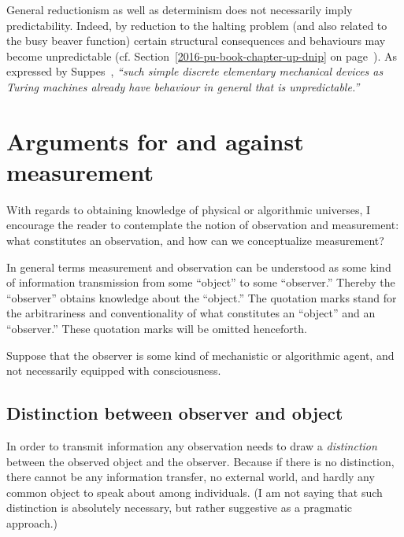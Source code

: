 General reductionism as well as
determinism does not necessarily imply predictability.
Indeed, by reduction to the halting problem
(and also related to the busy beaver function)
certain structural consequences and behaviours
may become unpredictable (cf. Section~\ref{2016-pu-book-chapter-up-dnip} on page~\pageref{2016-pu-book-chapter-up-dnip}).
As expressed by Suppes~\cite[p.~246]{suppes-1993},
{\em ``such simple discrete elementary mechanical devices as Turing machines already have behaviour in general that is unpredictable.''}



\section{Arguments for and against measurement}
\label{2016-pu-book-chapter-eo-measurement}

With regards to obtaining knowledge of physical or algorithmic  universes,
I encourage the reader to contemplate the notion of observation and measurement: what constitutes an observation,
and how can we conceptualize measurement?


In general terms measurement and observation
can be understood as some kind of information transmission from some ``object'' to some ``observer.''
Thereby the ``observer'' obtains knowledge about the ``object.''
The quotation marks stand for the arbitrariness and conventionality of what constitutes an ``object'' and an ``observer.''
These quotation marks will be omitted henceforth.

Suppose that the observer is some kind of mechanistic or algorithmic agent,
and not necessarily equipped with consciousness.

\subsection{Distinction between observer and object}

In order to transmit information any observation needs to draw a {\em distinction} between the observed object and the observer.
Because if there is no distinction, there cannot be any information transfer, no external world, and hardly any common object to speak about among individuals.
(I am not saying that such distinction is absolutely necessary, but rather suggestive as a pragmatic approach.)


